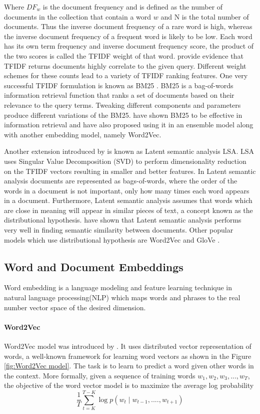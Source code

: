 Where $DF_{w}$ is the document frequency and is defined as the number of documents in the collection that contain a word $w$ and N is the total number of documents. Thus the inverse document frequency of a rare word is high, whereas the inverse document frequency of a frequent word is likely to be low. Each word has its own term frequency and inverse document frequency score, the product of the two scores is called the TFIDF weight of that word. \citet{ramos2003using} provide evidence that TFIDF returns
documents highly correlate to the given query. Different weight schemes for these counts lead to a variety of TFIDF ranking features. One very successful TFIDF
formulation is known as BM25 \citep{robertson2009probabilistic}.
BM25  is a bag-of-words information retrieval function that ranks a set of documents based on their relevance to the query terms. Tweaking different components and parameters produce different variations of the BM25. \citet{mitra2016dual} have shown BM25 to be effective in information retrieval and have also proposed using it in an ensemble model along with another embedding model, namely Word2Vec. 


Another extension introduced by \citet{dumais2004latent} is known as Latent semantic analysis LSA.
LSA uses Singular Value Decomposition (SVD) to perform dimensionality reduction on the TFIDF vectors resulting in smaller and better features. In Latent semantic analysis documents are represented as bags-of-words, where the order of the words in a document is not important, only how many times each word appears in a document. Furthermore, Latent semantic analysis assumes that words which are close in meaning will appear in similar pieces of text, a concept known as the distributional hypothesis. \citet{boling2014semantic} have shown that Latent semantic analysis performs very well in finding semantic similarity between documents. Other popular models which use distributional hypothesis are Word2Vec \citep{mikolov2013efficient} and GloVe \citep{pennington2014glove}.
\subsection{Word and Document Embeddings} 
Word embedding is a language modeling and feature learning technique in natural language processing(NLP) which maps words and phrases to the real number vector space of the desired dimension. 

\paragraph{Word2Vec} Word2Vec model was  introduced by \citet{mikolov2013efficient}. It uses distributed vector representation of words, a well-known framework for learning word vectors as shown in the Figure \ref{fig:Word2Vec model}. The task is to learn to predict a word given other words in the context.
More formally, given a sequence of training words
$w_{1}, w_{2}, w_{3}, ..., w_{T} $, the objective of the word vector model is to maximize the average log probability
\\
\begin{equation}
\frac{1}{T} \sum_{t=K}^{T-K} \log p(w_{t} \mid w_{t-1},....,w_{t+1}) 
\end{equation}

